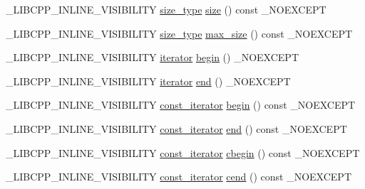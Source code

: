 \begin{DoxyCompactItemize}
\item 
\+\_\+\+L\+I\+B\+C\+P\+P\+\_\+\+I\+N\+L\+I\+N\+E\+\_\+\+V\+I\+S\+I\+B\+I\+L\+I\+T\+Y \hyperlink{classunordered__multimap_a977c4093df6d4d0302f280de19af4b58}{size\+\_\+type} \hyperlink{classunordered__multimap_a29e1e919824d4b9c696ef552eee446ff}{size} () const \+\_\+\+N\+O\+E\+X\+C\+E\+P\+T
\item 
\+\_\+\+L\+I\+B\+C\+P\+P\+\_\+\+I\+N\+L\+I\+N\+E\+\_\+\+V\+I\+S\+I\+B\+I\+L\+I\+T\+Y \hyperlink{classunordered__multimap_a977c4093df6d4d0302f280de19af4b58}{size\+\_\+type} \hyperlink{classunordered__multimap_aab604f937bdc80b9ec3b4f3c02cccf22}{max\+\_\+size} () const \+\_\+\+N\+O\+E\+X\+C\+E\+P\+T
\item 
\+\_\+\+L\+I\+B\+C\+P\+P\+\_\+\+I\+N\+L\+I\+N\+E\+\_\+\+V\+I\+S\+I\+B\+I\+L\+I\+T\+Y \hyperlink{classunordered__multimap_a7b508cae41ac3a258ca80609ec43db47}{iterator} \hyperlink{classunordered__multimap_a8a7f5de2dfa888b1b08dbab27d5b3f1f}{begin} () \+\_\+\+N\+O\+E\+X\+C\+E\+P\+T
\item 
\+\_\+\+L\+I\+B\+C\+P\+P\+\_\+\+I\+N\+L\+I\+N\+E\+\_\+\+V\+I\+S\+I\+B\+I\+L\+I\+T\+Y \hyperlink{classunordered__multimap_a7b508cae41ac3a258ca80609ec43db47}{iterator} \hyperlink{classunordered__multimap_ab093a3aafb8f8b93124ced836e868d14}{end} () \+\_\+\+N\+O\+E\+X\+C\+E\+P\+T
\item 
\+\_\+\+L\+I\+B\+C\+P\+P\+\_\+\+I\+N\+L\+I\+N\+E\+\_\+\+V\+I\+S\+I\+B\+I\+L\+I\+T\+Y \hyperlink{classunordered__multimap_a3cb373bd19680f9933781c04905fde39}{const\+\_\+iterator} \hyperlink{classunordered__multimap_a168e750308f83f2506f92cffd7a33379}{begin} () const \+\_\+\+N\+O\+E\+X\+C\+E\+P\+T
\item 
\+\_\+\+L\+I\+B\+C\+P\+P\+\_\+\+I\+N\+L\+I\+N\+E\+\_\+\+V\+I\+S\+I\+B\+I\+L\+I\+T\+Y \hyperlink{classunordered__multimap_a3cb373bd19680f9933781c04905fde39}{const\+\_\+iterator} \hyperlink{classunordered__multimap_ab43bf22a91f0bbb29f7fdb653c13371d}{end} () const \+\_\+\+N\+O\+E\+X\+C\+E\+P\+T
\item 
\+\_\+\+L\+I\+B\+C\+P\+P\+\_\+\+I\+N\+L\+I\+N\+E\+\_\+\+V\+I\+S\+I\+B\+I\+L\+I\+T\+Y \hyperlink{classunordered__multimap_a3cb373bd19680f9933781c04905fde39}{const\+\_\+iterator} \hyperlink{classunordered__multimap_a935d90f582bfb33e4dc134d5903bcc62}{cbegin} () const \+\_\+\+N\+O\+E\+X\+C\+E\+P\+T
\item 
\+\_\+\+L\+I\+B\+C\+P\+P\+\_\+\+I\+N\+L\+I\+N\+E\+\_\+\+V\+I\+S\+I\+B\+I\+L\+I\+T\+Y \hyperlink{classunordered__multimap_a3cb373bd19680f9933781c04905fde39}{const\+\_\+iterator} \hyperlink{classunordered__multimap_a5818121099bdb8a73b9d9a9c97d4c78d}{cend} () const \+\_\+\+N\+O\+E\+X\+C\+E\+P\+T

\end{DoxyCompactItemize}
